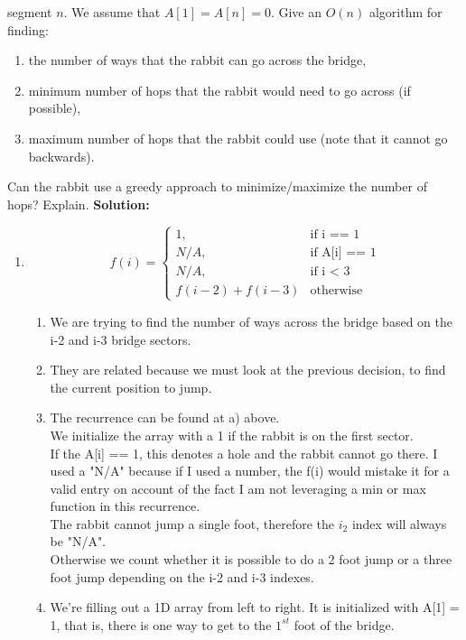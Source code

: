 \documentclass[11pt]{article}
\begin{document}
\begin{enumerate}
  segment $n$. We assume that $A[1]=A[n]=0$. Give an $O(n)$ algorithm for
  finding: 
\begin{enumerate}
\item the number of ways that the rabbit can go across the bridge,
\item minimum number of hops that the rabbit would need to go
  across (if possible),
\item maximum number of hops that the rabbit could use (note that
  it cannot go backwards).
\end{enumerate}
Can the rabbit use a greedy approach to minimize/maximize the
number of hops? Explain.
\textbf{Solution:}\\
\begin{enumerate}
\item
\begin{equation}
f(i)=\begin{cases}
1, & \text{if i == 1}\\
N/A, & \text{if A[i] == 1}\\
N/A, & \text{if i $<$ 3}\\
f(i-2) + f(i-3) & \text{otherwise}
\end{cases}
\end{equation}

\begin{enumerate}
\item
We are trying to find the number of ways across the bridge based on the i-2 and i-3 bridge sectors.
\item
They are related because we must look at the previous decision, to find the current position to jump.
\item
The recurrence can be found at a) above.\\
We initialize the array with a 1 if the rabbit is on the first sector.\\
If the A[i] == 1, this denotes a hole and the rabbit cannot go there. I used a "N/A" because if I used a number, the f(i) would mistake it for a valid entry on account of the fact I am not leveraging a min or max function in this recurrence.\\
The rabbit cannot jump a single foot, therefore the $i_2$ index will always be "N/A".\\
Otherwise we count whether it is possible to do a 2 foot jump or a three foot jump depending on the i-2 and i-3 indexes.
\item
We're filling out a 1D array from left to right. It is initialized with A[1] = 1, that is, there is one way to get to the $1^{st}$ foot of the bridge.



\end{enumerate}
\end{enumerate}
\end{enumerate}
\end{document}
